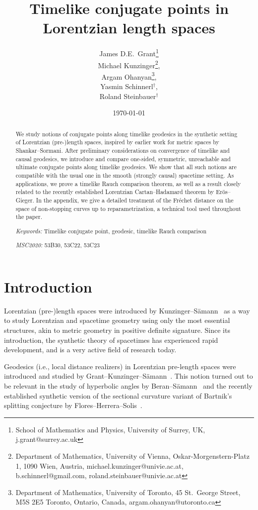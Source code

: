 \documentclass[a4paper,11pt]{article}
\title{Timelike conjugate points in Lorentzian length spaces}
\author{James D.E.\ Grant\footnote{School of Mathematics and Physics, University of Surrey, UK, j.grant@surrey.ac.uk}\\
Michael Kunzinger\footnote{Department of Mathematics, University of Vienna, Oskar-Morgenstern-Platz 1, 1090 Wien, Austria, \newline michael.kunzinger@univie.ac.at, b.schinnerl@gmail.com, roland.steinbauer@univie.ac.at},\\
Argam Ohanyan\footnote{Department of Mathematics, University of Toronto, 45 St.\ George Street, M5S 2E5 Toronto, Ontario, Canada, argam.ohanyan@utoronto.ca},\\
Yasmin Schinnerl${}^\dagger$,\\
Roland Steinbauer${}^\dagger$
}
\numberwithin{equation}{section}
\theoremstyle{plain}
\theoremstyle{definition}
\begin{document}
\date{\today}


\maketitle

\begin{abstract}

We study notions of conjugate points along timelike geodesics in the synthetic setting of Lorentzian (pre-)length spaces, inspired by earlier work for metric spaces by Shankar--Sormani. After preliminary considerations on convergence of timelike and causal geodesics, we introduce and compare one-sided, symmetric, unreachable and ultimate conjugate points along timelike geodesics. We show that all such notions are compatible with the usual one in the smooth (strongly causal) spacetime setting. As applications, we prove a timelike Rauch comparison theorem, as well as a result closely related to the recently established Lorentzian Cartan--Hadamard theorem by Er\"{o}s--Gieger. In the appendix, we give a detailed treatment of the Fr\'{e}chet distance on the space of non-stopping curves up to reparametrization, a technical tool used throughout the paper.

\vspace{1em}

\noindent
\emph{Keywords:} Timelike conjugate point, geodesic, timelike Rauch comparison
\medskip

\noindent
\emph{MSC2020:} 53B30, 53C22, 53C23

\end{abstract}

\tableofcontents


\section{Introduction}\label{section: introduction}

Lorentzian (pre-)length spaces were introduced by Kunzinger--S\"{a}mann~\cite{kunzinger2018lorentzian} as a way to study Lorentzian and spacetime geometry using only the most essential structures, akin to metric geometry in positive definite signature. Since its introduction, the synthetic theory of spacetimes has experienced rapid development, and is a very active field of research today.

Geodesics (i.e., local distance realizers) in Lorentzian pre-length spaces were introduced and studied by Grant--Kunzinger--S\"{a}mann~\cite{grant2019inextendibility}. This notion turned out to be relevant in the study of hyperbolic angles by Beran--S\"{a}mann~\cite{beran2022angles} and the recently established synthetic version of the sectional curvature variant of Bartnik's splitting conjecture by Flores--Herrera--Solis~\cite{flores2024low}.
\end{document}

